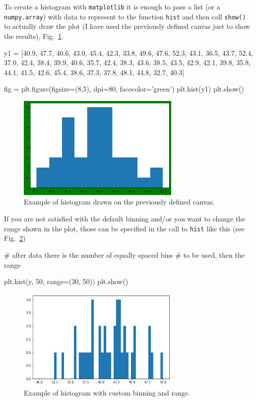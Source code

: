 To create a histogram with \texttt{matplotlib} it is enough to pass a list (or a \texttt{numpy.array}) with data to represent to the function \texttt{hist} and then call \texttt{show()} to actually draw the plot (I have used the previously defined canvas just to show the results), Fig.~\ref{fig:histo1}.

\begin{ipythonnon}
y1 = [40.9, 47.7, 40.6, 43.0, 45.4, 42.3, 33.8, 49.6,
47.6, 52.3, 43.1, 36.5, 43.7, 52.4, 37.0, 42.4, 38.4, 39.9, 40.6, 35.7, 42.4,
38.3, 43.6, 38.5, 43.5, 42.9, 42.1, 39.8, 35.8, 44.1,
41.5, 42.6, 45.4, 38.6, 37.3, 37.8, 48.1, 44.8, 32.7, 40.3]

fig = plt.figure(figsize=(8,5), dpi=80, facecolor='green')
plt.hist(y1)
plt.show()
\end{ipythonnon}

\begin{figure}[htb]
	\centering
	\includegraphics[width=0.7\textwidth]{figures/histo1}
	\caption{Example of histogram drawn on the previously defined canvas.}
	\label{fig:histo1}
\end{figure}

If you are not satisfied with the default binning and/or you want to change the range shown in the plot, those can be specified in the call to \texttt{hist} like this (see Fig.~\ref{fig:histo2})

\begin{ipythonnon}
# after data there is the number of equally spaced bins
# to be used, then the range

plt.hist(y, 50, range=(30, 50))
plt.show()
\end{ipythonnon}

\begin{figure}[htb]
	\centering
	\includegraphics[width=0.7\textwidth]{figures/histo2}
	\caption{Example of histogram with custom binning and range.}
	\label{fig:histo2}
\end{figure}

